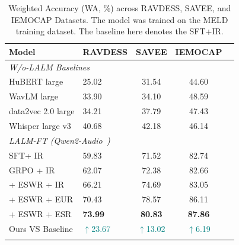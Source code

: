 \documentclass[11pt]{article}
\begin{document}
\begin{table}[t]
	\caption{Weighted Accuracy (WA, \%) across RAVDESS, SAVEE, and IEMOCAP Datasets. The model was trained on the MELD training dataset. The baseline here denotes the SFT+IR.}
	\label{tab:multi-dataset}
	\centering
	\small
	\setlength{\tabcolsep}{4.2pt}
	\begin{tabularx}{0.49\textwidth}{llccc}
		\toprule
		\textbf{Model}     & \textbf{RAVDESS}                  & \textbf{SAVEE}                    & \textbf{IEMOCAP}                 \\
		\midrule
		\multicolumn{5}{l}{\textit{W/o-LALM Baselines}}                                                                               \\
		HuBERT large       & 25.02                             & 31.54                             & 44.60                            \\
		WavLM large        & 33.90                             & 34.10                             & 48.59                            \\
		data2vec 2.0 large & 34.21                             & 37.79                             & 47.43                            \\
		Whisper large v3   & 40.68                             & 42.18                             & 46.14                            \\
		\midrule

		\multicolumn{5}{l}{\textit{LALM-FT (Qwen2-Audio~\cite{chu2024qwen2})}}                                                        \\
		SFT+ IR            & 59.83                             & 71.52                             & 82.74                            \\
		GRPO + IR          & 62.07                             & 72.38                             & 82.66                            \\
		+ ESWR + IR        & 66.21                             & 74.69                             & 83.05                            \\
		+ ESWR + EUR       & 70.43                             & 78.57                             & 86.11                            \\
		+ ESWR + ESR       & \textbf{73.99}                    & \textbf{80.83}                    & \textbf{87.86}                   \\
		\midrule
		Ours VS Baseline   & \textcolor{teal}{$\uparrow$23.67} & \textcolor{teal}{$\uparrow$13.02} & \textcolor{teal}{$\uparrow$6.19} \\
		\bottomrule
		\vspace{-0.5cm}
	\end{tabularx}
\end{table}
\end{document}
